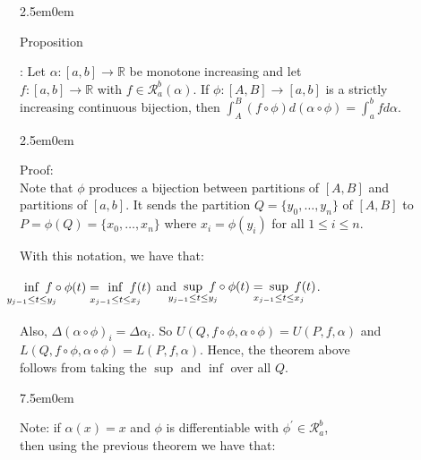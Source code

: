 \documentclass{book}
\newcommand{\hTwo}{%
   \color{MidnightBlue}%
   \fontsize{13}{15}\selectfont%
}
\newcommand{\hThree}{%
   \color{PineGreen!85!Orange}
   \fontsize{13}{15}\selectfont%
}
\newcommand{\teachComment}{
   \color{Orange}%
   \fontsize{12}{14}\selectfont%
}
\newenvironment{myIndent}{%
   \begin{adjustwidth}{2.5em}{0em}%
}{%
   \end{adjustwidth}%
}
\newenvironment{myTindent}{%
   \begin{adjustwidth}{7.5em}{0em}%
}{%
   \end{adjustwidth}%
}
\newcounter{PropNumber}
\newcommand{\propCount}[1][1]{%
   \addtocounter{PropNumber}{#1}%
   \thePropNumber%
}
\newcommand{\retTwo}{\hfill\bigbreak}
\begin{document}
{\begin{myIndent}\hTwo
   Proposition \propCount: Let $\alpha: [a, b] \longrightarrow \mathbb{R}$ be monotone increasing and let\\ $f: [a, b] \longrightarrow \mathbb{R}$ with $f \in \mathscr{R}_a^b(\alpha)$. If $\phi: [A, B] \longrightarrow [a, b]$ is a strictly\\ increasing continuous bijection, then $\int_A^B \left(f\circ\phi\right) d(\alpha \circ \phi) = \int_a^b fd\alpha$.\\ [-6pt]

   {\begin{myIndent}\hThree
      Proof:\\
      Note that $\phi$ produces a bijection between partitions of $[A, B]$ and\\ partitions of $[a, b]$. It sends the partition $Q = \{y_0, \ldots, y_n\}$ of $[A, B]$ to\\ $P = \phi(Q) = \{x_0, \ldots, x_n\}$ where $x_i = \phi(y_i)$ for all $1 \leq i \leq n$.\retTwo

      With this notation, we have that:
      
      {\centering $\hspace{-1.05em}\inf\limits_{y_{j-1} \vphantom{\int_b}\leq t \leq y_{j}}\hspace{-1.1em}f\circ \phi(t) = \hspace{-1.05em}\inf\limits_{x_{j-1} \vphantom{\int_b}\leq t \leq x_{j}}\hspace{-1.1em}f(t)$ and $\hspace{-1.05em}\sup\limits_{y_{j-1}\leq t \leq y_{j}}\hspace{-0.9em}f\circ \phi(t) = \hspace{-1.05em}\sup\limits_{x_{j-1} \leq t \leq x_{j}}\hspace{-1em}f(t)$.\retTwo\par}

      Also, $\Delta(\alpha \circ \phi)_i = \Delta\alpha_i$. So $U(Q, f\circ \phi, \alpha \circ \phi) = U(P, f, \alpha)$ and\\ $L(Q, f\circ \phi, \alpha \circ \phi) = L(P, f, \alpha)$. Hence, the theorem above\\ follows from taking the $\sup$ and $\inf$ over all $Q$.\retTwo
      
      {\begin{myTindent}\teachComment
         Note: if $\alpha(x) = x$ and $\phi$ is differentiable with $\phi^\prime \in \mathscr{R}_a^b$,\\ then using the previous theorem we have that:


\end{myTindent}}
\end{myIndent}}
\end{myIndent}}
\end{document}
